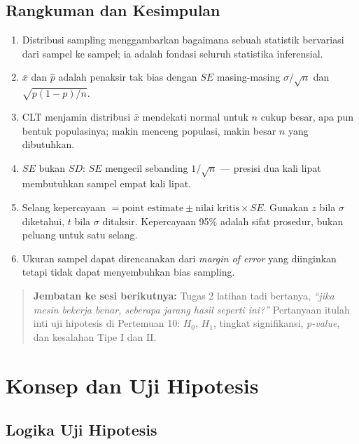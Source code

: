 \documentclass[
  indonesian,
  letterpaper,
]{book}
\providecommand{\tightlist}{%
  \setlength{\itemsep}{0pt}\setlength{\parskip}{0pt}}
\begin{document}
\section{Rangkuman dan Kesimpulan}\label{rangkuman-dan-kesimpulan-5}

\begin{enumerate}
\def\labelenumi{\arabic{enumi}.}
\tightlist
\item
  Distribusi sampling menggambarkan bagaimana sebuah statistik
  bervariasi dari sampel ke sampel; ia adalah fondasi seluruh statistika
  inferensial.
\item
  \(\bar{x}\) dan \(\hat{p}\) adalah penaksir tak bias dengan \(SE\)
  masing-masing \(\sigma / \sqrt{n}\) dan \(\sqrt{p(1 - p) / n}\).
\item
  CLT menjamin distribusi \(\bar{x}\) mendekati normal untuk \(n\) cukup
  besar, apa pun bentuk populasinya; makin menceng populasi, makin besar
  \(n\) yang dibutuhkan.
\item
  \(SE\) bukan \(SD\): \(SE\) mengecil sebanding \(1/\sqrt{n}\) ---
  presisi dua kali lipat membutuhkan sampel empat kali lipat.
\item
  Selang kepercayaan
  \(= \text{point estimate} \pm \text{nilai kritis} \times SE\). Gunakan
  \(z\) bila \(\sigma\) diketahui, \(t\) bila \(\sigma\) ditaksir.
  Kepercayaan 95\% adalah sifat prosedur, bukan peluang untuk satu
  selang.
\item
  Ukuran sampel dapat direncanakan dari \emph{margin of error} yang
  diinginkan tetapi tidak dapat menyembuhkan bias sampling.
\end{enumerate}

\begin{quote}
\textbf{Jembatan ke sesi berikutnya:} Tugas 2 latihan tadi bertanya,
\emph{``jika mesin bekerja benar, seberapa jarang hasil seperti ini?''}
Pertanyaan itulah inti uji hipotesis di Pertemuan 10: \(H_0\), \(H_1\),
tingkat signifikansi, \emph{p-value}, dan kesalahan Tipe I dan II.
\end{quote}


\chapter{Konsep dan Uji Hipotesis}\label{konsep-dan-uji-hipotesis}

\section{Logika Uji Hipotesis}\label{logika-uji-hipotesis}
\end{document}
